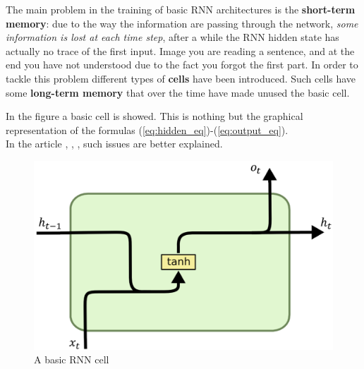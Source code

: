 \begin{multicols}{2}
    \noindent
    The main problem in the training of basic RNN architectures is the  \textbf{short-term memory}: due to the way the information are passing through the network, \textit{some information is lost at each time step}, after a while the RNN hidden state has actually no trace of the first input. Image you are reading a sentence, and at the end you have not understood due to the fact you forgot the first part. In order to tackle this problem different types of \textbf{cells} have been introduced. Such cells have some \textbf{long-term memory} that over the time have made unused the basic cell. 

    In the figure a basic cell is showed. This is nothing but the graphical representation of the formulas (\ref{eq:hidden_eq})-(\ref{eq:output_eq}).\\

    In the article \citeauthor{pascanu2013difficulty}, \textit{}, , \cite{pascanu2013difficulty} such issues are better explained.

    \begin{figure}[H]
        \centering
        \includegraphics[scale=0.25]{img/rnn_basic_cell.png}
        \caption{A basic RNN cell}
    \end{figure}
    
\end{multicols}

